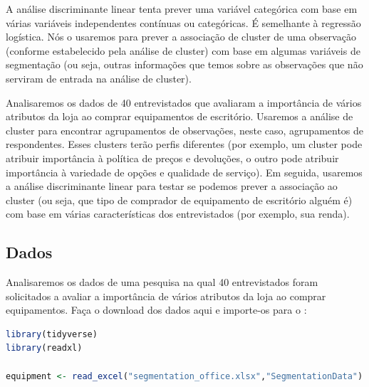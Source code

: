 \documentclass{article}
\begin{document}
A análise discriminante linear tenta prever uma variável categórica com base em várias variáveis independentes contínuas ou categóricas. É semelhante à regressão logística. Nós o usaremos para prever a associação de cluster de uma observação (conforme estabelecido pela análise de cluster) com base em algumas variáveis de segmentação (ou seja, outras informações que temos sobre as observações que não serviram de entrada na análise de cluster).

Analisaremos os dados de 40 entrevistados que avaliaram a importância de vários atributos da loja ao comprar equipamentos de escritório. Usaremos a análise de cluster para encontrar agrupamentos de observações, neste caso, agrupamentos de respondentes. Esses clusters terão perfis diferentes (por exemplo, um cluster pode atribuir importância à política de preços e devoluções, o outro pode atribuir importância à variedade de opções e qualidade de serviço). Em seguida, usaremos a análise discriminante linear para testar se podemos prever a associação ao cluster (ou seja, que tipo de comprador de equipamento de escritório alguém é) com base em várias características dos entrevistados (por exemplo, sua renda).


\subsection{Dados}

Analisaremos os dados de uma pesquisa na qual 40 entrevistados foram solicitados a avaliar a importância de vários atributos da loja ao comprar equipamentos. Faça o download dos dados aqui e importe-os para o \faRProject:

\begin{lstlisting}[language=R]
library(tidyverse) 
library(readxl)

equipment <- read_excel("segmentation_office.xlsx","SegmentationData") # Importa o arquivo Excel

\end{lstlisting}
\end{document}

